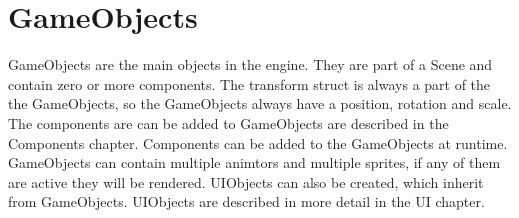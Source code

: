 \section{GameObjects}
\label{sec:gameObjects}
GameObjects are the main objects in the engine. They are part of a Scene and contain zero or more components.
The transform struct is always a part of the the GameObjects, so the GameObjects always have a position, rotation and scale.
The components are can be added to GameObjects are described in the Components chapter.
Components can be added to the GameObjects at runtime.
GameObjects can contain multiple animtors and multiple sprites, if any of them are active they will be rendered.
UIObjects can also be created, which inherit from GameObjects. UIObjects are described in more detail in the UI chapter.